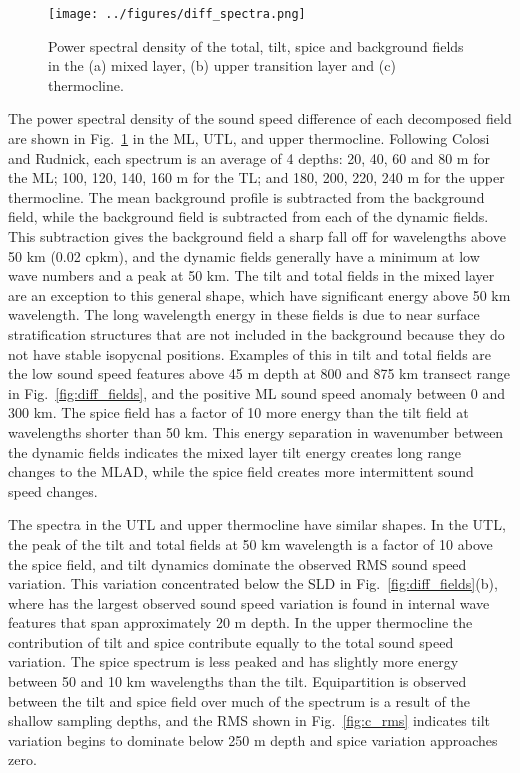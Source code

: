 \documentclass[preprint,NumberedRefs]{JASA}
\begin{document}
\begin{figure}
\texttt{[image: ../figures/diff\_spectra.png]}
        \caption{\label{fig:spectra}{Power spectral density of the total, tilt, spice and background fields in the (a) mixed layer, (b) upper transition layer and (c) thermocline.}}
\end{figure}
The power spectral density of the sound speed difference of each decomposed field are shown in Fig.~\ref{fig:spectra} in the ML, UTL, and upper thermocline. Following Colosi and Rudnick\cite{colosi2020observations}, each spectrum is an average of 4 depths: 20, 40, 60 and 80 m for the ML; 100, 120, 140, 160 m for the TL; and 180, 200, 220, 240 m for the upper thermocline. The mean background profile is subtracted from the background field, while the background field is subtracted from each of the dynamic fields. This subtraction gives the background field a sharp fall off for wavelengths above 50 km (0.02 cpkm), and the dynamic fields generally have a minimum at low wave numbers and a peak at 50 km. The tilt and total fields in the mixed layer are an exception to this general shape, which have significant energy above 50 km wavelength. The long wavelength energy in these fields is due to near surface stratification structures that are not included in the background because they do not have stable isopycnal positions. Examples of this in tilt and total fields are the low sound speed features above 45 m depth at 800 and 875 km transect range in Fig.~\ref{fig:diff_fields}, and the positive ML sound speed anomaly between 0 and 300 km. The spice field has a factor of 10 more energy than the tilt field at wavelengths shorter than 50 km. This energy separation in wavenumber between the dynamic fields indicates the mixed layer tilt energy creates long range changes to the MLAD, while the spice field creates more intermittent sound speed changes.

The spectra in the UTL and upper thermocline have similar shapes. In the UTL, the peak of the tilt and total fields at 50 km wavelength is a factor of 10 above the spice field, and tilt dynamics dominate the observed RMS sound speed variation. This variation concentrated below the SLD in Fig.~\ref{fig:diff_fields}(b), where has the largest observed sound speed variation is found in internal wave features that span approximately 20 m depth. In the upper thermocline the contribution of tilt and spice contribute equally to the total sound speed variation. The spice spectrum is less peaked and has slightly more energy between 50 and 10 km wavelengths than the tilt. Equipartition is observed between the tilt and spice field over much of the spectrum is a result of the shallow sampling depths, and the RMS shown in Fig.~\ref{fig:c_rms} indicates tilt variation begins to dominate below 250 m depth and spice variation approaches zero.
\end{document}
